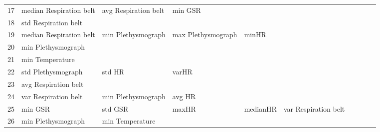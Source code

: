 \begin{landscape}
\begin{table}[]
\begin{tabular}{l|llllllll}
17       & median Respiration belt & avg Respiration belt  & min GSR                 &                         &                         &                       &                      &          &                      &        \\
18       & std Respiration belt    &                       &                         &                         &                         &                       &                      &          &                      &        \\
19       & median Respiration belt & min Plethysmograph    & max Plethysmograph      & minHR                   &                         &                       &                      &          &                      &        \\
20       & min Plethysmograph      &                       &                         &                         &                         &                       &                      &          &                      &        \\
21       & min Temperature         &                       &                         &                         &                         &                       &                      &          &                      &        \\
22       & std Plethysmograph      & std HR                & varHR                   &                         &                         &                       &                      &          &                      &        \\
23       & avg Respiration belt    &                       &                         &                         &                         &                       &                      &          &                      &        \\
24       & var Respiration belt    & min Plethysmograph    & avg HR                  &                         &                         &                       &                      &          &                      &        \\
25       & min GSR                 & std GSR               & maxHR                   & medianHR                & var Respiration belt    &                       &                      &          &                      &        \\
26       & min Plethysmograph      & min Temperature       &                         &                         &                         &                       &                      &          &                      &        \\

\end{tabular}
\end{table}
\end{landscape}
